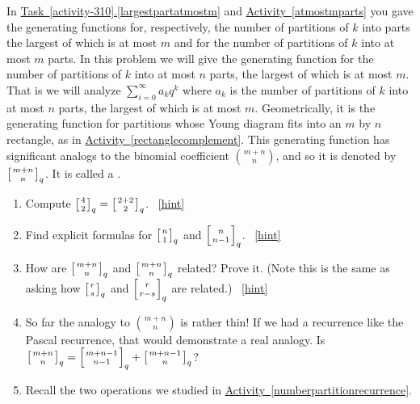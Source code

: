 \documentclass{book}
\begin{document}
\setcounter{project}{327}
\addtocounter{project}{-1}
\begin{activity}[]\label{qtorialformula}
\hypertarget{p-1665}{}%
In \hyperref[largestpartatmostm]{Task~\ref{activity-310}.\ref{largestpartatmostm}} and \hyperref[atmostmparts]{Activity~\ref{atmostmparts}} you gave the generating functions for, respectively, the number of partitions of \(k\) into parts the largest of which is at most \(m\) and for the number of partitions of \(k\) into at most \(m\) parts. In this problem we will give the generating function for the number of partitions of \(k\) into at most \(n\) parts, the largest of which is at most \(m\). That is we will analyze \(\sum_{i=0}^\infty a_kq^k\) where \(a_k\) is the number of partitions of \(k\) into at most \(n\) parts, the largest of which is at most \(m\). Geometrically, it is the generating function for partitions whose Young diagram fits into an \(m\) by \(n\) rectangle, as in \hyperref[rectanglecomplement]{Activity~\ref{rectanglecomplement}}. This generating function has significant analogs to the binomial coefficient \(\binom{m+n}{n}\), and so it is denoted by \(\left[{m+n\atop n}\right]_q\). It is called a .%
\begin{enumerate}[font=\bfseries,label=(\alph*),ref=\alph*]
\item\label{task-282} \hypertarget{p-1666}{}%
Compute \(\left[{4\atop2}\right]_q=\left[{2+2\atop2}\right]_q\).%
~\hfill{\tiny\hyperlink{a-327.a}{[hint]}\hypertarget{q-327.a}{}}\item\label{task-283} \hypertarget{p-1669}{}%
Find explicit formulas for \(\left[{n\atop1}\right]_q\) and \(\left[{n\atop n-1}\right]_q\).%
~\hfill{\tiny\hyperlink{a-327.b}{[hint]}\hypertarget{q-327.b}{}}\item\label{task-284} \hypertarget{p-1672}{}%
How are \(\left[{m+n\atop n}\right]_q\) and \(\left[{m+n\atop n}\right]_q\) related? Prove it. (Note this is the same as asking how \(\left[{r\atop s}\right]_q\) and \(\left[{r\atop r-s}\right]_q\) are related.)%
~\hfill{\tiny\hyperlink{a-327.c}{[hint]}\hypertarget{q-327.c}{}}\item\label{task-285} \hypertarget{p-1675}{}%
So far the analogy to \(\binom{m+n}{n}\) is rather thin! If we had a recurrence like the Pascal recurrence, that would demonstrate a real analogy. Is \(\left[{m+n\atop n}\right]_q= \left[{m+n-1\atop n-1}\right]_q+\left[{m+n-1\atop n}\right]_q\)?%
\item\label{task-286} \hypertarget{p-1677}{}%
Recall the two operations we studied in \hyperref[numberpartitionrecurrence]{Activity~\ref{numberpartitionrecurrence}}.%

\end{enumerate}
\end{activity}
\end{document}
